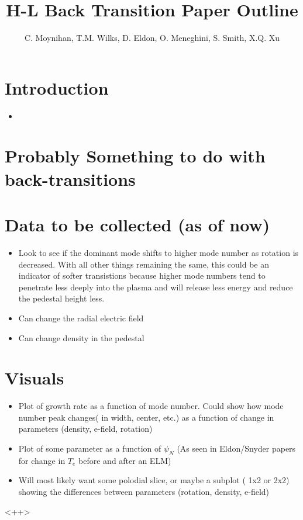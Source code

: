 \documentclass[a4paper]{article}
\begin{document}
\title{H-L Back Transition Paper Outline} %
\author{C. Moynihan, T.M. Wilks, D. Eldon, O. Meneghini, S. Smith, X.Q. Xu}
\date{}
\maketitle

\section{Introduction}

\begin{itemize}
	\item 
\end{itemize}

\section{Probably Something to do with back-transitions}

\section{Data to be collected (as of now)}

\begin{itemize}
	\item Look to see if the dominant mode shifts to higher mode number as rotation is decreased. With all other things remaining the same, this could be an indicator of softer transistions because higher mode numbers tend to penetrate less deeply into the plasma and will release less energy and reduce the pedestal height less. 
	\item Can change the radial electric field 
	\item Can change density in the pedestal 		
\end{itemize}

\section{Visuals}
\begin{itemize}
	\item Plot of growth rate as a function of mode number. Could show how mode number peak changes( in width, center, etc.) as a function of change in parameters (density, e-field, rotation) 
	\item Plot of some parameter as a function of $\psi_{N}$ (As seen in Eldon/Snyder papers for change in $T_{e}$ before and after an ELM)
	\item Will most likely want some polodial slice, or maybe a subplot ( 1x2 or 2x2) showing the differences between parameters (rotation, density, e-field)
		
\end{itemize}<++>
\end{document}
